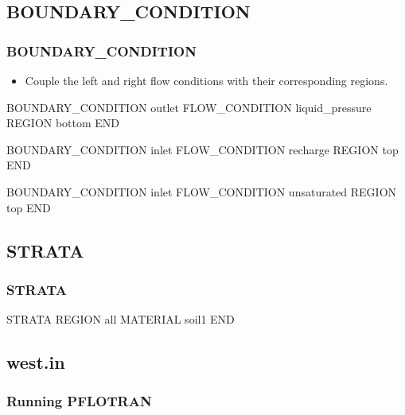 \documentclass{beamer}
\newcommand\greencomment[1]{{{\color{green} #1}}}
\begin{document}
\subsection{BOUNDARY\_CONDITION}

\begin{frame}[fragile]\frametitle{BOUNDARY\_CONDITION}

\begin{itemize}
\item Couple the \greencomment{left} and \greencomment{right} flow conditions with their corresponding regions.
\end{itemize}

\begin{semiverbatim}
BOUNDARY_CONDITION outlet
  FLOW_CONDITION liquid_pressure
  REGION bottom
END

BOUNDARY_CONDITION inlet
  FLOW_CONDITION recharge
  REGION top
END

BOUNDARY_CONDITION inlet
  FLOW_CONDITION unsaturated
  REGION top
END
\end{semiverbatim}

\end{frame}


\subsection{STRATA}

\begin{frame}[fragile]\frametitle{STRATA}

\begin{semiverbatim}

STRATA
  REGION all
  MATERIAL soil1
END

\end{semiverbatim}

\end{frame}

\subsection{west.in}

\begin{frame}[fragile]\frametitle{Running PFLOTRAN}


\end{frame}
\end{document}
